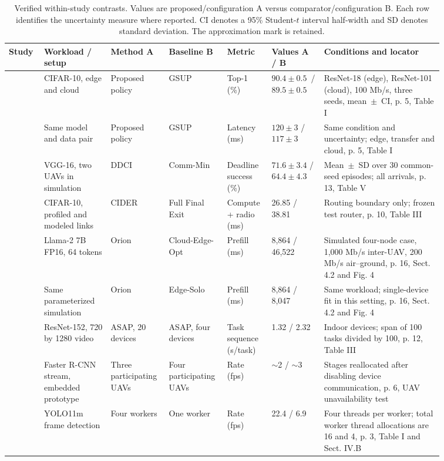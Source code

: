\documentclass[journal]{IEEEtran}
\begin{document}
\begin{table}[!tp]
\caption{Verified within-study contrasts. Values are proposed/configuration A versus comparator/configuration B. Each row identifies the uncertainty measure where reported. CI denotes a 95\% Student-$t$ interval half-width and SD denotes standard deviation. The approximation mark is retained.}\label{tab:outcomes}
\centering
\fontsize{8}{10}\selectfont\setlength{\tabcolsep}{2.5pt}\renewcommand{\arraystretch}{1.22}
\begin{tabular}{@{}Y{0.0602\linewidth}Y{0.1485\linewidth}Y{0.0968\linewidth}Y{0.0968\linewidth}Y{0.0884\linewidth}Y{0.1147\linewidth}Y{0.2529\linewidth}@{}}
\toprule
Study & Workload / setup & Method A & Baseline B & Metric & Values A / B & Conditions and locator \\
\midrule
\cite{R0080} & CIFAR-10, edge and cloud & Proposed policy & GSUP & Top-1 (\%) & \mbox{$90.4\pm0.5$ /}\newline\mbox{$89.5\pm0.5$} & ResNet-18 (edge), ResNet-101 (cloud), 100 Mb/s, three seeds, \mbox{mean $\pm$ CI}, p. 5, Table I \\
\cite{R0080} & Same model and data pair & Proposed policy & GSUP & Latency (ms) & $120\pm3$ / $117\pm3$ & Same condition and uncertainty; edge, transfer and cloud, p. 5, Table I \\
\cite{R0092} & VGG-16, two UAVs in simulation & DDCI & Comm-Min & Deadline success (\%) & $71.6\pm3.4$ / $64.4\pm4.3$ & \mbox{Mean $\pm$ SD} over 30 common-seed episodes; all arrivals, p. 13, Table V \\
\cite{R0075} & CIFAR-10, profiled and modeled links & CIDER & Full Final Exit & Compute + radio (ms) & 26.85 / 38.81 & Routing boundary only; frozen test router, p. 10, Table III \\
\cite{R0074} & Llama-2 7B FP16, 64 tokens & Orion & Cloud-Edge-Opt & Prefill (ms) & 8,864 / 46,522 & Simulated four-node case, 1,000 Mb/s inter-UAV, 200 Mb/s air--ground, p. 16, Sect. 4.2 and Fig. 4 \\
\cite{R0074} & Same parameterized simulation & Orion & Edge-Solo & Prefill (ms) & 8,864 / 8,047 & Same workload; single-device fit in this setting, p. 16, Sect. 4.2 and Fig. 4 \\
\cite{R0014} & ResNet-152, 720 by 1280 video & ASAP, 20 devices & ASAP, four devices & Task sequence (s/task) & 1.32 / 2.32 & Indoor devices; span of 100 tasks divided by 100, p. 12, Table III \\
\cite{R0062} & Faster R-CNN stream, embedded prototype & Three participating UAVs & Four participating UAVs & Rate (fps) & $\sim$2 / $\sim$3 & Stages reallocated after disabling device communication, p. 6, UAV unavailability test \\
\cite{R0125} & YOLO11m frame detection & Four workers & One worker & Rate (fps) & 22.4 / 6.9 & Four threads per worker; total worker thread allocations are 16 and 4, p. 3, Table I and Sect. IV.B \\
\bottomrule
\end{tabular}
\end{table}
\end{document}
